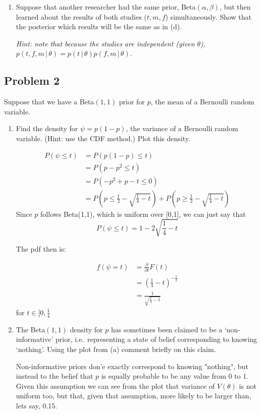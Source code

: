\documentclass{article}
\newcommand{\1}{\mathbf{1}}
\begin{document}
\begin{enumerate}
    \item[(f)] Suppose that another researcher had the same prior, Beta$(\alpha, \beta)$, but then learned about the results of both studies  ($t,m,f$) simultaneously. Show that the posterior which results will be the same as in (d).\par
    {\it Hint: note that because the studies are independent (given $\theta$), $p(t,f,m\,|\,\theta) = p(t\,|\,\theta)p(f,m\,|\,\theta)$.}
\end{enumerate}


\newpage
\subsection*{Problem 2} 
Suppose that we have a Beta$(1,1)$ prior for $p$, the mean of a Bernoulli random variable.
\begin{enumerate}
    \item[(a)] Find the density for $\psi = p(1-p)$, the variance of a Bernoulli random variable. (Hint: use the CDF method.) Plot this density.
    
    \begin{align*}
        P(\psi \leq t) &= P(p(1-p) \leq t) \\
        &= P(p-p^2 \leq t) \\
        &= P(-p^2 + p -t \leq 0) \\
        &= P\left( p \leq \frac{1}{2} - \sqrt{\frac{1}{4} - t}\right) + P\left( p \geq \frac{1}{2} - \sqrt{\frac{1}{4} - t}\right)
    \end{align*}
    Since $p$ follows Beta(1,1), which is uniform over [0,1], we can just say that
    $$P(\psi \leq t) = 1- 2\sqrt{\frac{1}{4} - t}$$
    
    The pdf then is:
    
    \begin{align*}
        f(\psi = t) &= \frac{\partial}{\partial t} F(t) \\
        &= \left(\frac{1}{4} - t\right)^{-\frac{1}{2}} \\
        &= \frac{1}{\sqrt{\frac{1}{4} - t}}
    \end{align*}
    for $t\in [0, \frac{1}{4}$
    
    \item[(b)] The Beta$(1,1)$ density for $p$ has sometimes been claimed to be a `non-informative' prior, i.e.~representing a state of belief corresponding to knowing `nothing'. Using the plot from (a) comment briefly on this claim. 
    
    Non-informative priors don'e exactly correspond to knowing "nothing", but instead to the belief that $p$ is equally probable to be any value from 0 to 1. Given this assumption we can see from the plot that variance of $V(\theta)$ is not uniform too, but that, given that assumption, more likely to be larger than, lets say, 0.15. 
\end{enumerate}
\end{document}
